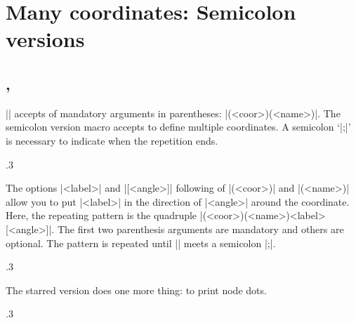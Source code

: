 \section{Many coordinates: Semicolon versions}
\label{si:manycoordinates}

\subsection{\protect\cmd{\tzcoors}, \protect\cmd{\tzcoors*}}
\label{ssi:tzcoors}

|\tzcoor| accepts  of mandatory arguments in parentheses: |(<coor>)(<name>)|.
The semicolon version macro \icmd{\tzcoors} accepts  to define multiple coordinates. A semicolon `|;|' is necessary to indicate when the repetition ends.

\begin{tzcode}{.3}
\end{tzcode}

The options |{<label>}| and |[<angle>]| following  of |(<coor>)| and |(<name>)| allow you to put |<label>| in the direction of |<angle>| around the coordinate.
Here, the repeating pattern is the quadruple |(<coor>)(<name>){<label>}[<angle>]|. The first two parenthesis arguments are mandatory and others are optional. The pattern is repeated until |\tzcoors| meets a semicolon |;|.

\begin{tzcode}{.3}
\end{tzcode}


The starred version \icmd{\tzcoors*} does one more thing: to print node dots.

\begin{tzcode}{.3}
\end{tzcode}



